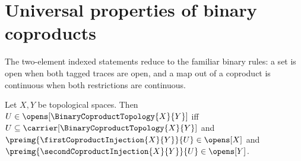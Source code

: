 \section{Universal properties of binary coproducts}



The two-element indexed statements reduce to the familiar binary rules: a
set is open when both tagged traces are open, and a map out of a coproduct is
continuous when both restrictions are continuous.

\begin{theorem}\label{binary_coproduct_open_iff}
    Let $X,Y$ be topological spaces.
    Then $U\in\opens[\BinaryCoproductTopology{X}{Y}]$ iff
        $U\subseteq\carrier[\BinaryCoproductTopology{X}{Y}]$ and
        $\preimg{\firstCoproductInjection{X}{Y}}{U}\in\opens[X]$ and
        $\preimg{\secondCoproductInjection{X}{Y}}{U}\in\opens[Y]$.
\end{theorem}
